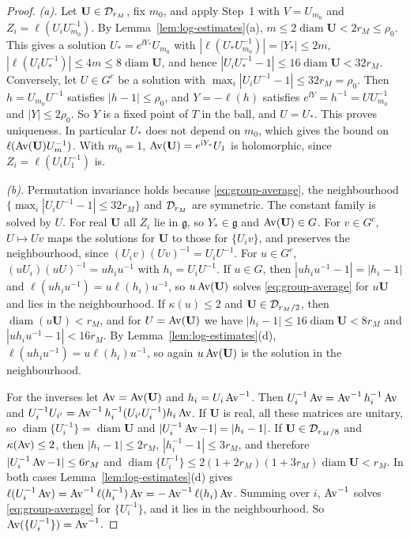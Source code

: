 \begin{proof}
\emph{(a).} Let $\mathbf U\in\mathcal D_{r_M}$, fix $m_0$, and apply Step~1 with $V=U_{m_0}$ and $Z_i=\ell(U_iU_{m_0}^{-1})$. By Lemma~\ref{lem:log-estimates}(a), $m\le2\operatorname{diam}\mathbf U<2r_M\le\rho_0$. This gives a solution $U_*=e^{\ii Y_*}U_{m_0}$ with $|\ell(U_*U_{m_0}^{-1})|=|Y_*|\le2m$, $|\ell(U_iU_*^{-1})|\le4m\le8\operatorname{diam}\mathbf U$, and hence $|U_iU_*^{-1}-1|\le16\operatorname{diam}\mathbf U<32r_M$. Conversely, let $U\in G^c$ be a solution with $\max_i|U_iU^{-1}-1|\le32r_M=\rho_0$. Then $h=U_{m_0}U^{-1}$ satisfies $|h-1|\le\rho_0$, and $Y=-\ell(h)$ satisfies $e^{\ii Y}=h^{-1}=UU_{m_0}^{-1}$ and $|Y|\le2\rho_0$. So $Y$ is a fixed point of $T$ in the ball, and $U=U_*$. This proves uniqueness. In particular $U_*$ does not depend on $m_0$, which gives the bound on $\ell(\operatorname{Av}(\mathbf U)U_m^{-1})$. With $m_0=1$, $\operatorname{Av}(\mathbf U)=e^{\mathrm i Y_*}U_1$ is holomorphic, since $Z_i=\ell(U_iU_1^{-1})$ is.

\emph{(b).} Permutation invariance holds because \eqref{eq:group-average}, the neighbourhood $\{\max_i|U_iU^{-1}-1|\le32r_M\}$ and $\mathcal D_{r_M}$ are symmetric. The constant family is solved by $U$. For real $\mathbf U$ all $Z_i$ lie in $\mathfrak g$, so $Y_*\in\mathfrak g$ and $\operatorname{Av}(\mathbf U)\in G$. For $v\in G^c$, $U\mapsto Uv$ maps the solutions for $\mathbf U$ to those for $\{U_iv\}$, and preserves the neighbourhood, since $(U_iv)(Uv)^{-1}=U_iU^{-1}$. For $u\in G^c$, $(uU_i)(uU)^{-1}=uh_iu^{-1}$ with $h_i=U_iU^{-1}$. If $u\in G$, then $|uh_iu^{-1}-1|=|h_i-1|$ and $\ell(uh_iu^{-1})=u\ell(h_i)u^{-1}$, so $u\operatorname{Av}(\mathbf U)$ solves \eqref{eq:group-average} for $u\mathbf U$ and lies in the neighbourhood. If $\kappa(u)\le2$ and $\mathbf U\in\mathcal D_{r_M/2}$, then $\operatorname{diam}(u\mathbf U)<r_M$, and for $U=\operatorname{Av}(\mathbf U)$ we have $|h_i-1|\le16\operatorname{diam}\mathbf U<8r_M$ and $|uh_iu^{-1}-1|<16r_M$. By Lemma~\ref{lem:log-estimates}(d), $\ell(uh_iu^{-1})=u\ell(h_i)u^{-1}$, so again $u\operatorname{Av}(\mathbf U)$ is the solution in the neighbourhood.

For the inverses let $\operatorname{Av}=\operatorname{Av}(\mathbf U)$ and $h_i=U_i\operatorname{Av}^{-1}$. Then $U_i^{-1}\operatorname{Av}=\operatorname{Av}^{-1}h_i^{-1}\operatorname{Av}$ and $U_i^{-1}U_{i'}=\operatorname{Av}^{-1}h_i^{-1}(U_{i'}U_i^{-1})h_i\operatorname{Av}$. If $\mathbf U$ is real, all these matrices are unitary, so $\operatorname{diam}\{U_i^{-1}\}=\operatorname{diam}\mathbf U$ and $|U_i^{-1}\operatorname{Av}-1|=|h_i-1|$. If $\mathbf U\in\mathcal D_{r_M/8}$ and $\kappa(\operatorname{Av})\le2$, then $|h_i-1|\le2r_M$, $|h_i^{-1}-1|\le3r_M$, and therefore $|U_i^{-1}\operatorname{Av}-1|\le6r_M$ and $\operatorname{diam}\{U_i^{-1}\}\le2(1+2r_M)(1+3r_M)\operatorname{diam}\mathbf U<r_M$. In both cases Lemma~\ref{lem:log-estimates}(d) gives $\ell(U_i^{-1}\operatorname{Av})=\operatorname{Av}^{-1}\ell(h_i^{-1})\operatorname{Av}=-\operatorname{Av}^{-1}\ell(h_i)\operatorname{Av}$. Summing over $i$, $\operatorname{Av}^{-1}$ solves \eqref{eq:group-average} for $\{U_i^{-1}\}$, and it lies in the neighbourhood. So $\operatorname{Av}(\{U_i^{-1}\})=\operatorname{Av}^{-1}$.


\end{proof}
